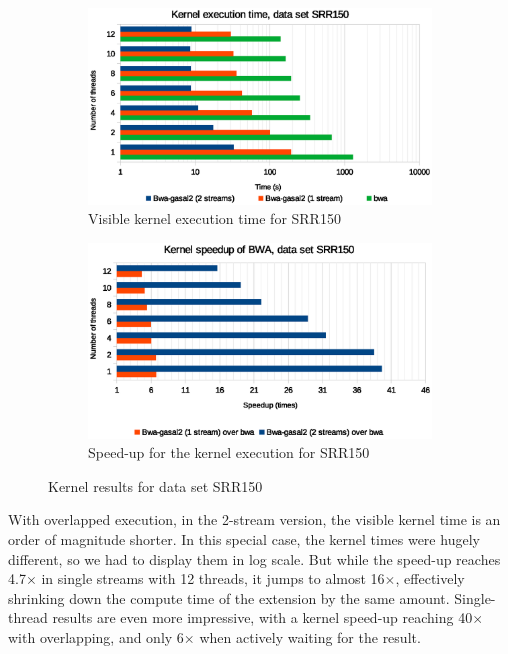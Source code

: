 \begin{figure}[p]
	\centering
	\begin{subfigure}[t]{1\textwidth}
		\centering
		\includegraphics[width=1\textwidth]{srr150/kernel-exec-time-srr150}
		\caption{Visible kernel execution time for SRR150}
		\label{fig:kernel-exec-time-srr150}
	\end{subfigure}%
	
	\begin{subfigure}[b]{1\textwidth}
		\centering
		\includegraphics[width=1\textwidth]{srr150/kernel-exec-speed-up-srr150}
		\caption{Speed-up for the kernel execution for SRR150}
		\label{fig:kernel-exec-speed-up-srr150}
	\end{subfigure}
	\caption{Kernel results for data set SRR150}
\end{figure}

With overlapped execution, in the 2-stream version, the visible kernel time is an order of magnitude shorter. In this special case, the kernel times were hugely different, so we had to display them in log scale. But while the speed-up reaches 4.7$\times$ in single streams with 12 threads, it jumps to almost 16$\times$, effectively shrinking down the compute time of the extension by the same amount. Single-thread results are even more impressive, with a  kernel speed-up reaching 40$\times$ with overlapping, and only 6$\times$ when actively waiting for the result.


